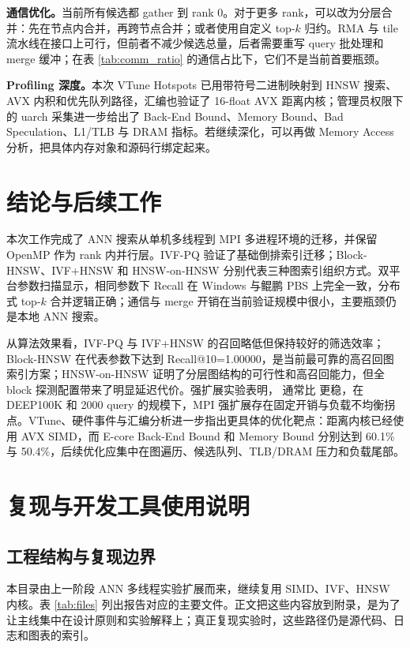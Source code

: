 \documentclass[a4paper,11pt,UTF8]{ctexart}
\newcommand{\code}[1]{\texttt{\detokenize{#1}}}
\begin{document}
\textbf{通信优化。}当前所有候选都 gather 到 rank 0。对于更多 rank，可以改为分层合并：先在节点内合并，再跨节点合并；或者使用自定义 top-$k$ 归约。RMA 与 tile 流水线在接口上可行，但前者不减少候选总量，后者需要重写 query 批处理和 merge 缓冲；在表 \ref{tab:comm_ratio} 的通信占比下，它们不是当前首要瓶颈。

\textbf{Profiling 深度。}本次 VTune Hotspots 已用带符号二进制映射到 HNSW 搜索、AVX 内积和优先队列路径，汇编也验证了 16-float AVX 距离内核；管理员权限下的 uarch 采集进一步给出了 Back-End Bound、Memory Bound、Bad Speculation、L1/TLB 与 DRAM 指标。若继续深化，可以再做 Memory Access 分析，把具体内存对象和源码行绑定起来。

\section{结论与后续工作}

本次工作完成了 ANN 搜索从单机多线程到 MPI 多进程环境的迁移，并保留 OpenMP 作为 rank 内并行层。IVF-PQ 验证了基础倒排索引迁移；Block-HNSW、IVF+HNSW 和 HNSW-on-HNSW 分别代表三种图索引组织方式。双平台参数扫描显示，相同参数下 Recall 在 Windows 与鲲鹏 PBS 上完全一致，分布式 top-$k$ 合并逻辑正确；通信与 merge 开销在当前验证规模中很小，主要瓶颈仍是本地 ANN 搜索。

从算法效果看，IVF-PQ 与 IVF+HNSW 的召回略低但保持较好的筛选效率；Block-HNSW 在代表参数下达到 Recall@10=1.00000，是当前最可靠的高召回图索引方案；HNSW-on-HNSW 证明了分层图结构的可行性和高召回能力，但全 block 探测配置带来了明显延迟代价。强扩展实验表明，\code{np=4} 通常比 \code{np=8} 更稳，在 DEEP100K 和 2000 query 的规模下，MPI 强扩展存在固定开销与负载不均衡拐点。VTune、硬件事件与汇编分析进一步指出更具体的优化靶点：距离内核已经使用 AVX SIMD，而 E-core Back-End Bound 和 Memory Bound 分别达到 60.1\% 与 50.4\%，后续优化应集中在图遍历、候选队列、TLB/DRAM 压力和负载尾部。
\label{LastBodyPage}

\clearpage
\appendix
\setcounter{page}{1}
\renewcommand{\thepage}{A-\arabic{page}}
\cfoot{\thepage}
\section{复现与开发工具使用说明}

\subsection{工程结构与复现边界}
\label{sec:appendix_engineering}

本目录由上一阶段 ANN 多线程实验扩展而来，继续复用 SIMD、IVF、HNSW 内核。表 \ref{tab:files} 列出报告对应的主要文件。正文把这些内容放到附录，是为了让主线集中在设计原则和实验解释上；真正复现实验时，这些路径仍是源代码、日志和图表的索引。
\end{document}
